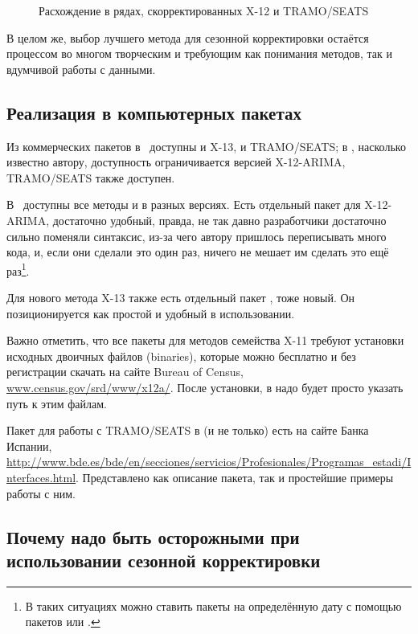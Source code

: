 \documentclass[final,pdftex]{../../template/epsilonj}\usepackage[]{graphicx}\usepackage[]{color}
\begin{document}
\begin{figure}
\begin{minipage}{.48\textwidth}
  \caption{Расхождение в рядах, скорректированных X-12 и TRAMO/SEATS}
  \label{fig:test2}
\end{minipage}
\end{figure}

В целом же, выбор лучшего метода для сезонной корректировки остаётся процессом во многом творческим и требующим как понимания методов, так и вдумчивой работы с данными. 

\subsection{Реализация в компьютерных пакетах}

Из коммерческих пакетов в~ доступны и X-13, и TRAMO/SEATS; в , насколько известно автору, доступность ограничивается версией X-12-ARIMA, TRAMO/SEATS также доступен. 

В~ доступны все методы и в разных версиях. Есть отдельный пакет  для X-12-ARIMA,
достаточно удобный, правда, не так давно разработчики достаточно сильно поменяли синтаксис, из-за чего автору пришлось переписывать много кода, и, если они сделали это один раз, ничего не мешает им сделать это ещё раз\footnote{В таких ситуациях можно ставить пакеты  на определённую дату с помощью пакетов  или .}. 

Для нового метода X-13 также есть отдельный пакет ,
тоже новый. Он позиционируется как простой и удобный в использовании. 

Важно отметить, что все пакеты для методов семейства X-11 требуют установки исходных двоичных файлов (binaries), которые можно бесплатно и без регистрации скачать на сайте Bureau of Census, \href{http://www.census.gov/srd/www/x12a/}{www.census.gov/srd/www/x12a/}. После установки, в  надо будет просто указать путь к этим файлам. 

Пакет для работы с TRAMO/SEATS в   (и не только) есть на сайте Банка Испании, \url{http://www.bde.es/bde/en/secciones/servicios/Profesionales/Programas_estadi/Interfaces.html}. Представлено как описание пакета, так и простейшие примеры работы с ним. 

\subsection{Почему надо быть осторожными при использовании сезонной корректировки}
\end{document}
